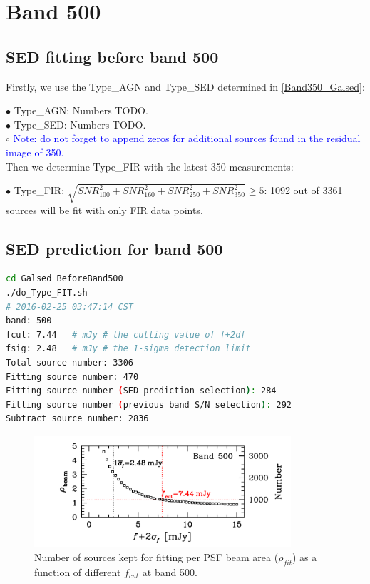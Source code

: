 \documentclass[11pt,a4paper]{article}
\begin{document}
\clearpage

\section{Band 500}

\subsection{SED fitting before band 500}
\label{Band500_Galsed}

Firstly, we use the Type\_AGN and Type\_SED determined in \ref{Band350_Galsed}:

\indent\hspace{15pt}$\bullet$ 
Type\_AGN: Numbers TODO. 
\\
\indent\hspace{15pt}$\bullet$ 
Type\_SED: Numbers TODO. 
\\
\indent\hspace{15pt}$\circ$ 
\textcolor{blue}{Note: \textcolor{blue}{do not forget} to append zeros for additional sources found in the residual image of 350.}
\\

Then we determine Type\_FIR with the latest 350 measurements:

\indent\hspace{15pt}$\bullet$ 
Type\_FIR: $\sqrt{SNR_{100}^2+SNR_{160}^2+SNR_{250}^2+SNR_{350}^2} \ge 5$: 1092 out of 3361 sources will be fit with only FIR data points. 
\\

\subsection{SED prediction for band 500}
\label{Band500_Galpre}

\begin{lstlisting}[language=bash]
cd Galsed_BeforeBand500
./do_Type_FIT.sh
# 2016-02-25 03:47:14 CST
band: 500
fcut: 7.44   # mJy # the cutting value of f+2df
fsig: 2.48   # mJy # the 1-sigma detection limit
Total source number: 3306
Fitting source number: 470
Fitting source number (SED prediction selection): 284
Fitting source number (previous band S/N selection): 292
Subtract source number: 2836
\end{lstlisting}

\begin{figure}[H]
	\caption{Number of sources kept for fitting per PSF beam area ($\rho_{fit}$) as a function of different $f_{cut}$ at band 500.}
	\includegraphics[width=0.85\textwidth]{plot_cutting_flux_500}
\end{figure}
\end{document}
